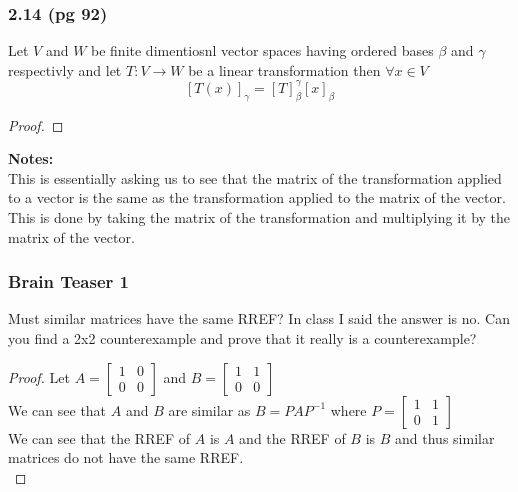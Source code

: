 \documentclass[answers,12pt,addpoints]{exam}
\begin{document}
\subsubsection{2.14 (pg 92)}
Let $V$ and $W$ be finite dimentiosnl vector spaces having ordered bases $\beta$ and $\gamma$ respectivly and let $T:V \to W$ be a linear transformation then $\forall x \in V$
$$ [T(x)]_{\gamma} = [T]_{\beta}^{\gamma}[x]_{\beta}$$
\begin{proof}

\end{proof}
\textbf{Notes:}\\
This is essentially asking us to see that the matrix of the transformation applied to a vector is the same as the transformation applied to the matrix of the vector. This is done by taking the matrix of the transformation and multiplying it by the matrix of the vector.\\

\subsubsection{Brain Teaser 1}
Must similar matrices have the same RREF?  In class I said the answer is no.  Can you find a 2x2 counterexample and prove that it really is a counterexample?\\
\begin{proof}
    Let $A = \begin{bmatrix} 1 & 0 \\ 0 & 0 \end{bmatrix}$ and $B = \begin{bmatrix} 1 & 1 \\ 0 & 0 \end{bmatrix}$\\
    We can see that $A$ and $B$ are similar as $B = PAP^{-1}$ where $P = \begin{bmatrix} 1 & 1 \\ 0 & 1 \end{bmatrix}$\\
    We can see that the RREF of $A$ is $A$ and the RREF of $B$ is $B$ and thus similar matrices do not have the same RREF.\\
\end{proof}
\end{document}
